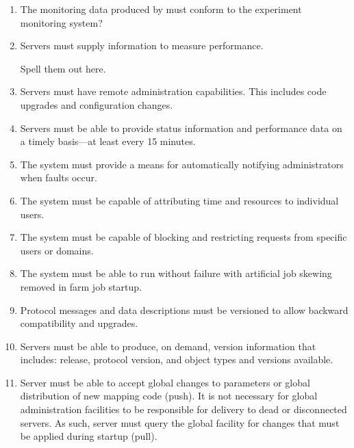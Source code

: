 \begin{enumerate}

\item

The monitoring data produced by \frontier must conform to the experiment
monitoring system?

\item

Servers must supply information to measure performance.

\begin{fixme}
Spell them out here.
\end{fixme}

\item

Servers must have remote administration capabilities. This includes
code upgrades and configuration changes.

\item

Servers must be able to provide status information and performance
data on a timely basis---at least every 15 minutes.

\item

The system must provide a means for automatically notifying
administrators when faults occur.

\item

The system must be capable of attributing time and resources to
individual users.

\item

The system must be capable of blocking and restricting requests from
specific users or domains.

\item

The system must be able to run without failure with artificial job
skewing removed in farm job startup.

\item

Protocol messages and data descriptions must be versioned to allow
backward compatibility and upgrades.

\item

Servers must be able to produce, on demand, version information that
includes: release, protocol version, and object types and versions
available.

\item

Server must be able to accept global changes to parameters or global
distribution of new mapping code (push). It is not necessary for
global administration facilities to be responsible for delivery to
dead or disconnected servers. As such, server must query the global
facility for changes that must be applied during startup (pull).

\end{enumerate}


